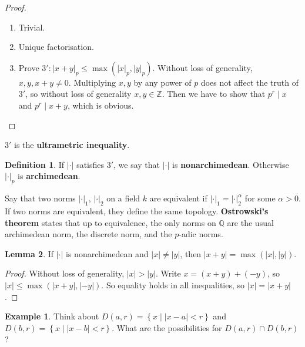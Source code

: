 \documentclass{article}
\newcommand{\Z}{\mathbb{Z}}
\newcommand{\Q}{\mathbb{Q}}
\newcommand{\rb}[1]{\left( #1 \right)}
\newcommand{\cb}[1]{\left\{ #1 \right\}}
\newcommand{\abs}[1]{\left\lvert #1 \right\rvert}
\theoremstyle{definition}\newtheorem{definition}{Definition}[section]
\theoremstyle{definition}\newtheorem{remark}[definition]{Remark}
\theoremstyle{definition}\newtheorem*{example}{Example}
\theoremstyle{definition}\newtheorem*{note}{Note}
\newtheorem{lemma}[definition]{Lemma}
\begin{document}
\begin{proof}
\hfill
\begin{enumerate}
\item Trivial.
\item Unique factorisation.
\item Prove $ 3' : \abs{x + y}_p \le \max\rb{\abs{x}_p, \abs{y}_p} $. Without loss of generality, $ x, y, x + y \ne 0 $. Multiplying $ x, y $ by any power of $ p $ does not affect the truth of $ 3' $, so without loss of generality $ x, y \in \Z $. Then we have to show that $ p^r \mid x $ and $ p^r \mid x + y $, which is obvious.
\end{enumerate}
\end{proof}

$ 3' $ is the \textbf{ultrametric inequality}.

\begin{definition}
If $ \abs{\cdot} $ satisfies $ 3' $, we say that $ \abs{\cdot} $ is \textbf{nonarchimedean}. Otherwise $ \abs{\cdot}_p $ is \textbf{archimedean}.
\end{definition}

Say that two norms $ \abs{\cdot}_1 $, $ \abs{\cdot}_2 $ on a field $ k $ are equivalent if $ \abs{\cdot}_1 = \abs{\cdot}_2^\alpha $ for some $ \alpha > 0 $. If two norms are equivalent, they define the same topology. \textbf{Ostrowski's theorem} states that up to equivalence, the only norms on $ \Q $ are the usual archimedean norm, the discrete norm, and the $ p $-adic norms.


\begin{lemma}
\label{lem:1.6}
If $ \abs{\cdot} $ is nonarchimedean and $ \abs{x} \ne \abs{y} $, then $ \abs{x + y} = \max\rb{\abs{x}, \abs{y}} $.
\end{lemma}

\begin{proof}
Without loss of generality, $ \abs{x} > \abs{y} $. Write $ x = \rb{x + y} + \rb{-y} $, so $ \abs{x} \le \max\rb{\abs{x + y}, \abs{-y}} $. So equality holds in all inequalities, so $ \abs{x} = \abs{x + y} $.
\end{proof}

\begin{example}
Think about $ D\rb{a, r} = \cb{x \mid \abs{x - a} < r} $ and $ D\rb{b, r} = \cb{x \mid \abs{x - b} < r} $. What are the possibilities for $ D\rb{a, r} \cap D\rb{b, r} $?
\end{example}
\end{document}

